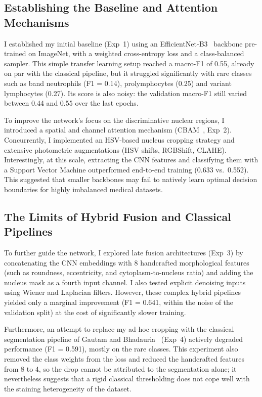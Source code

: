 \documentclass[twocolumn,a4paper]{article}
\begin{document}
\subsection{Establishing the Baseline and Attention Mechanisms}

I established my initial baseline (Exp~1) using an EfficientNet-B3~\cite{tan2019efficientnet} backbone pre-trained on ImageNet, with a weighted cross-entropy loss and a class-balanced sampler. This simple transfer learning setup reached a macro-F1 of 0.55, already on par with the classical pipeline, but it struggled significantly with rare classes such as band neutrophils (F1 = 0.14), prolymphocytes (0.25) and variant lymphocytes (0.27). Its score is also noisy: the validation macro-F1 still varied between 0.44 and 0.55 over the last epochs.

To improve the network's focus on the discriminative nuclear regions, I introduced a spatial and channel attention mechanism (CBAM~\cite{woo2018cbam}, Exp~2). Concurrently, I implemented an HSV-based nucleus cropping strategy and extensive photometric augmentations (HSV shifts, RGBShift, CLAHE). Interestingly, at this scale, extracting the CNN features and classifying them with a Support Vector Machine outperformed end-to-end training (0.633 vs.\ 0.552). This suggested that smaller backbones may fail to natively learn optimal decision boundaries for highly imbalanced medical datasets.

\subsection{The Limits of Hybrid Fusion and Classical Pipelines}

To further guide the network, I explored late fusion architectures (Exp~3) by concatenating the CNN embeddings with 8 handcrafted morphological features (such as roundness, eccentricity, and cytoplasm-to-nucleus ratio) and adding the nucleus mask as a fourth input channel. I also tested explicit denoising inputs using Wiener and Laplacian filters. However, these complex hybrid pipelines yielded only a marginal improvement (F1 = 0.641, within the noise of the validation split) at the cost of significantly slower training.

Furthermore, an attempt to replace my ad-hoc cropping with the classical segmentation pipeline of Gautam and Bhadauria~\cite{gautam2014} (Exp~4) actively degraded performance (F1 = 0.591), mostly on the rare classes. This experiment also removed the class weights from the loss and reduced the handcrafted features from 8 to 4, so the drop cannot be attributed to the segmentation alone; it nevertheless suggests that a rigid classical thresholding does not cope well with the staining heterogeneity of the dataset.
\end{document}
